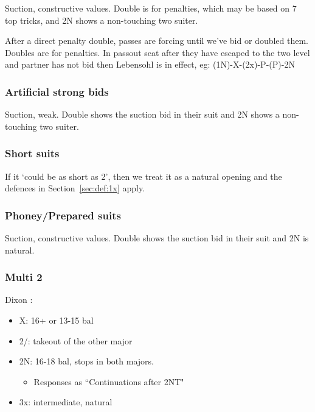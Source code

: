 \documentclass[a4paper,14pt]{extarticle}
\begin{document}
Suction, constructive values. Double is for penalties, which may be based on 7
top tricks, and 2N shows a non-touching two suiter. 

After a direct penalty double, passes are forcing until we've bid or doubled
them.  Doubles are for penalties. In passout seat after they have escaped to
the two level and partner has not bid then Lebensohl 
is in effect, eg: (1N)-X-(2x)-P-(P)-2N

\subsubsection{Artificial strong bids}
\label{sec:def:strong}

Suction, weak. Double shows the suction bid in their suit and 2N shows a
non-touching two suiter. 

\subsubsection{Short suits}
\label{sec:def:short}

If it `could be as short as 2', then we treat it as a natural opening and the
defences in Section~\ref{sec:def:1x} apply.

\subsubsection{Phoney/Prepared suits}
\label{sec:def:phoney}

Suction, constructive values. Double shows the suction bid in their suit and 2N
is natural. 

\subsubsection{Multi 2\diamonds}
\label{sec:def:multi}

\label{note:15}
Dixon :

\begin{itemize}
\item X: 16+ or 13-15 bal
\item 2\hearts/\spades: takeout of the other major
\item 2N: 16-18 bal, stops in both majors.
	\begin{itemize}
	\item Responses as ``Continuations after 2NT" 
	\end{itemize}
\item 3x: intermediate, natural
\end{itemize}
\end{document}
